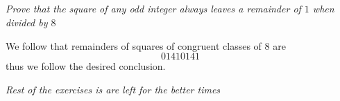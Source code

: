 \documentclass[11pt,oneside,titlepage]{book}
\begin{document}
\subsection{}

\textit{Prove that the square of any odd integer always leaves a remainder of $1$ when
  divided by $8$}

We follow that remainders  of squares of congruent classes of $8$ are
$$0 1 4 1 0 1 4 1$$
thus we follow the desired conclusion.

\textit{Rest of the exercises is are left for the better times}
\end{document}
